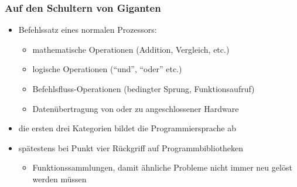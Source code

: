     \begin{frame}
        \frametitle{Auf den Schultern von Giganten}
        \begin{itemize}
            \item Befehlssatz eines normalen Prozessors:
            \begin{itemize}
                \pause
                \item mathematische Operationen (Addition, Vergleich, etc.)
                \pause
                \item logische Operationen ("`und"', "`oder"' etc.)
                \pause
                \item Befehlsfluss-Operationen (bedingter Sprung, Funktionsaufruf)
                \pause
                \item Datenübertragung von oder zu angeschlossener Hardware
            \end{itemize}
            \pause
            \item die ersten drei Kategorien bildet die Programmiersprache ab
            \item spätestens bei Punkt vier Rückgriff auf Programmbibliotheken
            \pause
            \begin{itemize}
                \item Funktionssammlungen, damit ähnliche Probleme nicht immer neu
                gelöst werden müssen
            \end{itemize}
        \end{itemize}
    \end{frame}

